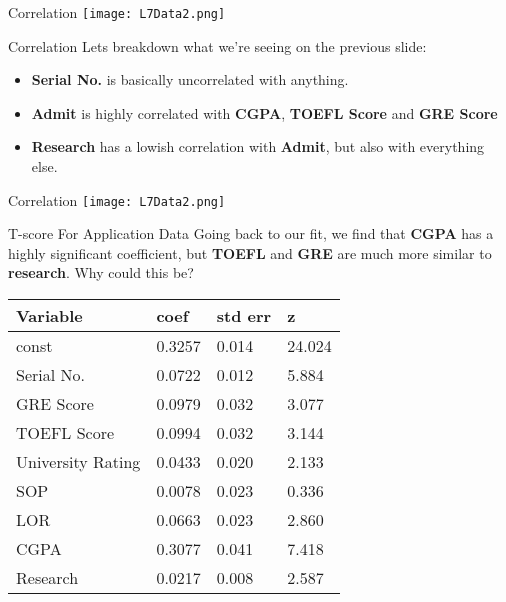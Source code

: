 \documentclass[10pt, table, dvipsnames,xcdraw, handout ]{beamer}
\begin{document}
\begin{frame}[fragile]{Correlation}
	\centering \texttt{[image: L7Data2.png]} 
\end{frame}




\begin{frame}[fragile]{Correlation}
Lets breakdown what we're seeing on the previous slide:\pause
\begin{itemize}
\item[] \textbf{Serial No.} is basically uncorrelated with anything. \pause
\item[] \textbf{Admit} is highly correlated with \textbf{CGPA}, \textbf{TOEFL Score} and \textbf{GRE Score}\pause
\item[] \textbf{Research} has a lowish correlation with \textbf{Admit}, but also with everything else.  
\end{itemize}
\end{frame}

\begin{frame}[fragile]{Correlation}
	\centering \texttt{[image: L7Data2.png]} 
\end{frame}



\begin{frame}[fragile]{T-score For Application Data}
Going back to our fit, we find that \textbf{CGPA} has a highly significant coefficient, but \textbf{TOEFL} and \textbf{GRE} are much more similar to \textbf{research}. Why could this be?
\begin{table}[]
\begin{tabular}{llll}
\hline
\textbf{Variable} & \textbf{coef} & \multicolumn{1}{c}{\textbf{std err}} & \textbf{z} \\ \hline
const             & 0.3257        & 0.014                                & 24.024     \\
Serial No.        & 0.0722        & 0.012                                & 5.884      \\
GRE Score         & 0.0979        & 0.032                                & 3.077      \\
TOEFL Score       & 0.0994        & 0.032                                & 3.144      \\
University Rating & 0.0433        & 0.020                                & 2.133      \\
SOP               & 0.0078        & 0.023                                & 0.336      \\
LOR               & 0.0663        & 0.023                                & 2.860      \\
CGPA              & 0.3077        & 0.041                                & 7.418      \\
Research          & 0.0217        & 0.008                                & 2.587     
\end{tabular}
\end{table}
\end{frame}
\end{document}
